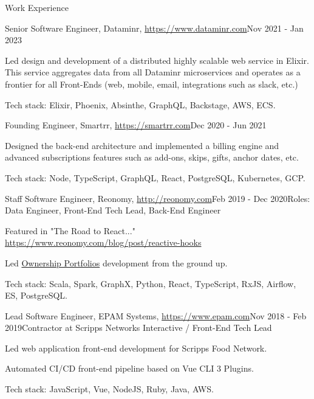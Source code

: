 \documentclass{resume}
\begin{document}
\begin{rSection}{Work Experience}

\begin{rSubsection}{Senior Software Engineer, Dataminr, \url{https://www.dataminr.com}}{Nov 2021 - Jan 2023}{}{}
\item Led design and development of a distributed highly scalable web service in Elixir. This service aggregates data from all Dataminr microservices and operates as a frontier for all Front-Ends (web, mobile, email, integrations such as slack, etc.)

Tech stack: Elixir, Phoenix, Absinthe, GraphQL, Backstage, AWS, ECS.
\end{rSubsection}

\begin{rSubsection}{Founding Engineer, Smartrr, \url{https://smartrr.com}}{Dec 2020 - Jun 2021}{}{}
\item Designed the back-end architecture and implemented a billing engine and advanced subscriptions features such as add-ons, skips, gifts, anchor dates, etc.

Tech stack: Node, TypeScript, GraphQL, React, PostgreSQL, Kubernetes, GCP.
\end{rSubsection}

\begin{rSubsection}{Staff Software Engineer, Reonomy, \url{http://reonomy.com}}{Feb 2019 - Dec 2020}{Roles: Data Engineer, Front-End Tech Lead, Back-End Engineer}{}
\item Featured in "The Road to React..." \url{https://www.reonomy.com/blog/post/reactive-hooks}
\item Led \href{https://www.reonomy.com/blog/post/reonomy-launches-ownership-portfolio-beta}{Ownership Portfolios} development from the ground up.

Tech stack: Scala, Spark, GraphX, Python, React, TypeScript, RxJS, Airflow, ES, PostgreSQL.
\end{rSubsection}

\begin{rSubsection}{Lead Software Engineer, EPAM Systems, \url{https://www.epam.com}}{Nov 2018 - Feb 2019}{Contractor at Scripps Networks Interactive / Front-End Tech Lead}{}
\item Led web application front-end development for Scripps Food Network.
\item Automated CI/CD front-end pipeline based on Vue CLI 3 Plugins.

Tech stack: JavaScript, Vue, NodeJS, Ruby, Java, AWS.
\end{rSubsection}


\end{rSection}
\end{document}
